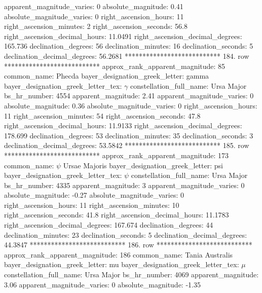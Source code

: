          apparent_magnitude_varies: 0
                absolute_magnitude: 0.41
         absolute_magnitude_varies: 0
             right_ascension_hours: 11
           right_ascension_minutes: 2
           right_ascension_seconds: 56.8
     right_ascension_decimal_hours: 11.0491
   right_ascension_decimal_degrees: 165.736
               declination_degrees: 56
               declination_minutes: 16
               declination_seconds: 5
       declination_decimal_degrees: 56.2681
*************************** 184. row ***************************
    approx_rank_apparent_magnitude: 85
                       common_name: Phecda
    bayer_designation_greek_letter: gamma
bayer_designation_greek_letter_tex: $\gamma$
           constellation_full_name: Ursa Major
                      bs_hr_number: 4554
                apparent_magnitude: 2.41
         apparent_magnitude_varies: 0
                absolute_magnitude: 0.36
         absolute_magnitude_varies: 0
             right_ascension_hours: 11
           right_ascension_minutes: 54
           right_ascension_seconds: 47.8
     right_ascension_decimal_hours: 11.9133
   right_ascension_decimal_degrees: 178.699
               declination_degrees: 53
               declination_minutes: 35
               declination_seconds: 3
       declination_decimal_degrees: 53.5842
*************************** 185. row ***************************
    approx_rank_apparent_magnitude: 173
                       common_name: $\psi$ Ursae Majoris
    bayer_designation_greek_letter: psi
bayer_designation_greek_letter_tex: $\psi$
           constellation_full_name: Ursa Major
                      bs_hr_number: 4335
                apparent_magnitude: 3
         apparent_magnitude_varies: 0
                absolute_magnitude: -0.27
         absolute_magnitude_varies: 0
             right_ascension_hours: 11
           right_ascension_minutes: 10
           right_ascension_seconds: 41.8
     right_ascension_decimal_hours: 11.1783
   right_ascension_decimal_degrees: 167.674
               declination_degrees: 44
               declination_minutes: 23
               declination_seconds: 5
       declination_decimal_degrees: 44.3847
*************************** 186. row ***************************
    approx_rank_apparent_magnitude: 186
                       common_name: Tania Australis
    bayer_designation_greek_letter: mu
bayer_designation_greek_letter_tex: $\mu$
           constellation_full_name: Ursa Major
                      bs_hr_number: 4069
                apparent_magnitude: 3.06
         apparent_magnitude_varies: 0
                absolute_magnitude: -1.35
